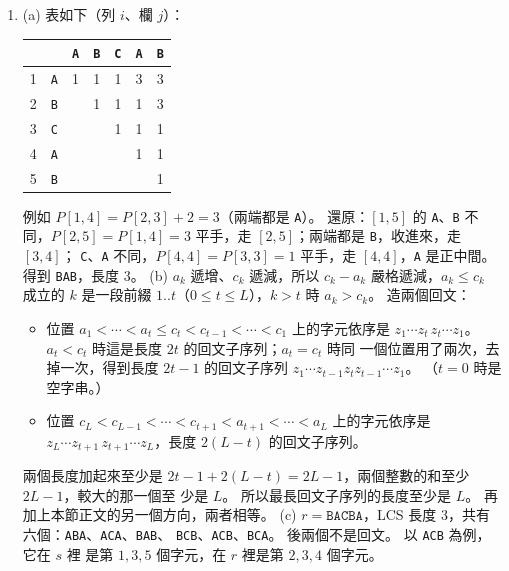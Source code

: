 \begin{enumerate}
\item (a) 表如下（列 $i$、欄 $j$）：
\begin{center}
\begin{tabular}{cc*{5}{c}}
& & \texttt{A} & \texttt{B} & \texttt{C} & \texttt{A} & \texttt{B} \\
\midrule
1 & \texttt{A} & 1 & 1 & 1 & 3 & 3 \\
2 & \texttt{B} & & 1 & 1 & 1 & 3 \\
3 & \texttt{C} & & & 1 & 1 & 1 \\
4 & \texttt{A} & & & & 1 & 1 \\
5 & \texttt{B} & & & & & 1 \\
\end{tabular}
\end{center}
例如 $P[1, 4] = P[2, 3] + 2 = 3$（兩端都是 \texttt{A}）。 還原：$[1, 5]$ 的 \texttt{A}、\texttt{B}
不同，$P[2, 5] = P[1, 4] = 3$ 平手，走 $[2, 5]$；兩端都是 \texttt{B}，收進來，走 $[3, 4]$；
\texttt{C}、\texttt{A} 不同，$P[4, 4] = P[3, 3] = 1$ 平手，走 $[4, 4]$，\texttt{A} 是正中間。
得到 \texttt{BAB}，長度 $3$。
(b) $a_k$ 遞增、$c_k$ 遞減，所以 $c_k - a_k$ 嚴格遞減，$a_k \le c_k$ 成立的 $k$ 是一段前綴
$1..t$（$0 \le t \le L$），$k > t$ 時 $a_k > c_k$。 造兩個回文：
\begin{itemize}
\item 位置 $a_1 < \cdots < a_t \le c_t < c_{t-1} < \cdots < c_1$ 上的字元依序是
$z_1 \cdots z_t\, z_t \cdots z_1$。 $a_t < c_t$ 時這是長度 $2t$ 的回文子序列；$a_t = c_t$ 時同
一個位置用了兩次，去掉一次，得到長度 $2t - 1$ 的回文子序列 $z_1 \cdots z_{t-1} z_t z_{t-1}
\cdots z_1$。 （$t = 0$ 時是空字串。）
\item 位置 $c_L < c_{L-1} < \cdots < c_{t+1} < a_{t+1} < \cdots < a_L$ 上的字元依序是
$z_L \cdots z_{t+1}\, z_{t+1} \cdots z_L$，長度 $2(L - t)$ 的回文子序列。
\end{itemize}
兩個長度加起來至少是 $2t - 1 + 2(L - t) = 2L - 1$，兩個整數的和至少 $2L - 1$，較大的那一個至
少是 $L$。 所以最長回文子序列的長度至少是 $L$。 再加上本節正文的另一個方向，兩者相等。
(c) $r = \texttt{BACBA}$，LCS 長度 $3$，共有六個：\texttt{ABA}、\texttt{ACA}、\texttt{BAB}、
\texttt{BCB}、\texttt{ACB}、\texttt{BCA}。 後兩個不是回文。 以 \texttt{ACB} 為例，它在 $s$ 裡
是第 $1, 3, 5$ 個字元，在 $r$ 裡是第 $2, 3, 4$ 個字元。


\end{enumerate}
